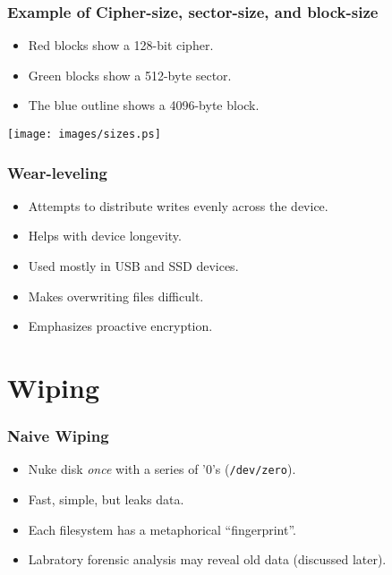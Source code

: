 \documentclass[xcolor={dvipsnames,svgnames},hyperref=dvips]{beamer}
\begin{document}
	\begin{frame}
		\frametitle{Example of Cipher-size, sector-size, and block-size}
		\begin{itemize}
		\item Red blocks show a 128-bit cipher.
		\item Green blocks show a 512-byte sector.
		\item The blue outline shows a 4096-byte block.
		\end{itemize}
		\centering
		\texttt{[image: images/sizes.ps]}
	\end{frame}

	\begin{frame}
		\frametitle{Wear-leveling}
		\begin{itemize}
		\item Attempts to distribute writes evenly across the device.
		\item Helps with device longevity.
		\item Used mostly in USB and SSD devices.
		\item Makes overwriting files difficult.
		\item Emphasizes proactive encryption.
		\end{itemize}
	\end{frame}

\section{Wiping}\label{wiping}
	\begin{frame}
		\frametitle{Naive Wiping}
		\begin{itemize}
		\item Nuke disk \textit{once} with a series of '0's (\texttt{/dev/zero}).
		\item Fast, simple, but leaks data.
		\item Each filesystem has a metaphorical ``fingerprint''.
		\item Labratory forensic analysis may reveal old data (discussed later).
		\end{itemize}
	\end{frame}
\end{document}
